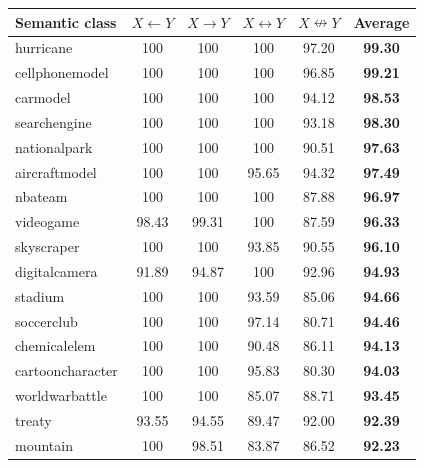 \begin{table}[h]
\tiny
\begin{center}
  \begin{tabular}{|l||c|c|c|c||c|}
    \hline
    \textbf{Semantic class}    & \textbf{$X \leftarrow Y$} & \textbf{$X \rightarrow Y$} & \textbf{$X \leftrightarrow Y$} & \textbf{$X \nleftrightarrow Y$} & \textbf{Average} \\
    \hline
    \hline
    hurricane         &    100  &    100  &    100  &  97.20  &  \textbf{99.30} \\
    cellphonemodel    &    100  &    100  &    100  &  96.85  &  \textbf{99.21} \\
    carmodel          &    100  &    100  &    100  &  94.12  &  \textbf{98.53} \\
    searchengine      &    100  &    100  &    100  &  93.18  &  \textbf{98.30} \\
    nationalpark      &    100  &    100  &    100  &  90.51  &  \textbf{97.63} \\
    aircraftmodel     &    100  &    100  &  95.65  &  94.32  &  \textbf{97.49} \\
    nbateam           &    100  &    100  &    100  &  87.88  &  \textbf{96.97} \\
    videogame         &  98.43  &  99.31  &    100  &  87.59  &  \textbf{96.33} \\
    skyscraper        &    100  &    100  &  93.85  &  90.55  &  \textbf{96.10} \\
    digitalcamera     &  91.89  &  94.87  &    100  &  92.96  &  \textbf{94.93} \\
    stadium           &    100  &    100  &  93.59  &  85.06  &  \textbf{94.66} \\
    soccerclub        &    100  &    100  &  97.14  &  80.71  &  \textbf{94.46} \\
    chemicalelem      &    100  &    100  &  90.48  &  86.11  &  \textbf{94.13} \\
    cartooncharacter  &    100  &    100  &  95.83  &  80.30  &  \textbf{94.03} \\
    worldwarbattle    &    100  &    100  &  85.07  &  88.71  &  \textbf{93.45} \\
    treaty            &  93.55  &  94.55  &  89.47  &  92.00  &  \textbf{92.39} \\
    mountain          &    100  &  98.51  &  83.87  &  86.52  &  \textbf{92.23} \\

\end{tabular}
\end{center}
\end{table}
